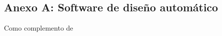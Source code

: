\begin{center}
	\section*{Anexo A: Software de dise\~no autom\'atico}
\end{center}

\noindent
\justify

Como complemento de 


